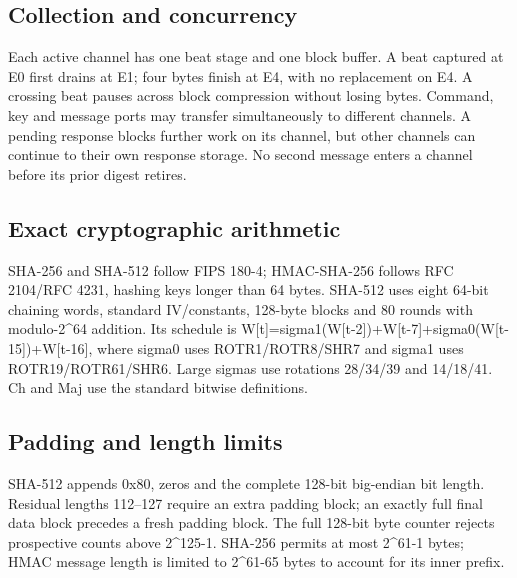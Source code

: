 \documentclass[11pt,a4paper]{article}
\begin{document}
\subsection{Collection and concurrency}

Each active channel has one beat stage and one block buffer. A beat captured at E0 first drains at E1; four bytes finish at E4,\allowbreak{} with no replacement on E4. A crossing beat pauses across block compression without losing bytes. Command,\allowbreak{} key and message ports may transfer simultaneously to different channels. A pending response blocks further work on its channel,\allowbreak{} but other channels can continue to their own response storage. No second message enters a channel before its prior digest retires.

\subsection{Exact cryptographic arithmetic}

SHA-256 and SHA-512 follow FIPS 180-4; HMAC-SHA-256 follows RFC 2104/\allowbreak{}RFC 4231,\allowbreak{} hashing keys longer than 64 bytes. SHA-512 uses eight 64-bit chaining words,\allowbreak{} standard IV/\allowbreak{}constants,\allowbreak{} 128-byte blocks and 80 rounds with modulo-2\textasciicircum{}64 addition. Its schedule is W[\allowbreak{}t]\allowbreak{}=\allowbreak{}sigma1(\allowbreak{}W[\allowbreak{}t-2]\allowbreak{})\allowbreak{}+\allowbreak{}W[\allowbreak{}t-7]\allowbreak{}+\allowbreak{}sigma0(\allowbreak{}W[\allowbreak{}t-15]\allowbreak{})\allowbreak{}+\allowbreak{}W[\allowbreak{}t-16]\allowbreak{},\allowbreak{} where sigma0 uses ROTR1/\allowbreak{}ROTR8/\allowbreak{}SHR7 and sigma1 uses ROTR19/\allowbreak{}ROTR61/\allowbreak{}SHR6. Large sigmas use rotations 28/\allowbreak{}34/\allowbreak{}39 and 14/\allowbreak{}18/\allowbreak{}41. Ch and Maj use the standard bitwise definitions.

\subsection{Padding and length limits}

SHA-512 appends 0x80,\allowbreak{} zeros and the complete 128-bit big-endian bit length. Residual lengths 112–127 require an extra padding block; an exactly full final data block precedes a fresh padding block. The full 128-bit byte counter rejects prospective counts above 2\textasciicircum{}125-1. SHA-256 permits at most 2\textasciicircum{}61-1 bytes; HMAC message length is limited to 2\textasciicircum{}61-65 bytes to account for its inner prefix.
\end{document}
